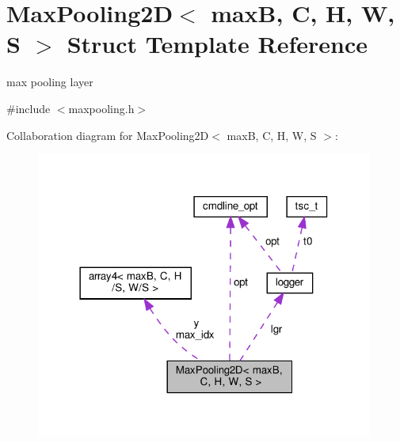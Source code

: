 \hypertarget{structMaxPooling2D}{}\section{Max\+Pooling2D$<$ maxB, C, H, W, S $>$ Struct Template Reference}
\label{structMaxPooling2D}


max pooling layer  




{\ttfamily \#include $<$maxpooling.\+h$>$}



Collaboration diagram for Max\+Pooling2D$<$ maxB, C, H, W, S $>$\+:
\nopagebreak
\begin{figure}[H]
\begin{center}
\leavevmode
\includegraphics[width=314pt]{structMaxPooling2D__coll__graph}
\end{center}
\end{figure}
